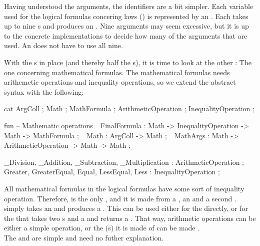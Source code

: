 Having understood the arguments, the identifiers are a bit simpler. Each variable used for the logical formulas concering laws () is represented by an . Each  takes up to nine s and produces an . Nine arguments may seem excessive, but it is up to the concrete implementations to decide how many of the arguments that are used. An  does not have to use all nine.

With the s in place (and thereby half the s),  it is time to look at the other : The one concerning mathematical formulas. The mathematical formulas needs arithemetic operations and inequality operations, so we extend the abstract syntax with the following:

\begin{lstgf}
    cat
        ArgColl ; Math ; MathFormula ; ArithmeticOperation ; InequalityOperation ;

    fun
        -- Mathematic operations
        _FinalFormula : Math -> InequalityOperation -> Math -> MathFormula ;
        _Math : ArgColl -> Math ;
        _MathArgs : Math -> ArithmeticOperation -> Math -> Math ;

        _Division, _Addition, _Subtraction, _Multiplication : ArithmeticOperation ;
        Greater, GreaterEqual, Equal, LessEqual, Less : InequalityOperation ;
\end{lstgf}

All mathematical formulas in the logical formulas have some sort of inequality operation. Therefore,  is the only , and it is made from a , an  and a second .\\
 simply takes an  and produces a . This can be used either for the  directly, or for the  that takes two s and a  and returns a . That way, arithmetic operations can be either a simple operation, or the (s) it is made of can be made .\\
The  and  are simple and need no futher explanation.

